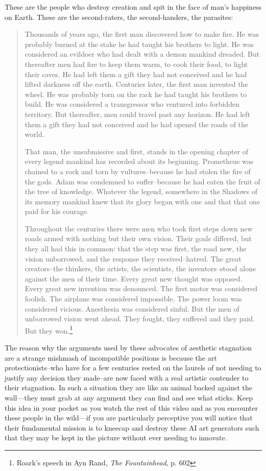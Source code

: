 \documentclass[11pt]{article}
\begin{document}
These are the people who destroy creation and spit in the face of man's happiness on Earth. These are the second-raters, the second-handers, the parasites:
\begin{quote}
Thousands of years ago, the first man discovered how to make fire. He was probably burned at the stake he had taught his brothers to light. He was considered an evildoer who had dealt with a demon mankind dreaded. But thereafter men had fire to keep them warm, to cook their food, to light their caves. He had left them a gift they had not conceived and he had lifted darkness off the earth. Centuries later, the first man invented the wheel. He was probably torn on the rack he had taught his brothers to build. He was considered a transgressor who ventured into forbidden territory. But thereafter, men could travel past any horizon. He had left them a gift they had not conceived and he had opened the roads of the world.

That man, the unsubmissive and first, stands in the opening chapter of every legend mankind has recorded about its beginning. Prometheus was chained to a rock and torn by vultures--because he had stolen the fire of the gods. Adam was condemned to suffer--because he had eaten the fruit of the tree of knowledge. Whatever the legend, somewhere in the Shadows of its memory mankind knew that its glory began with one and that that one paid for his courage.

Throughout the centuries there were men who took first steps down new roads armed with nothing but their own vision. Their goals differed, but they all had this in common: that the step was first, the road new, the vision unborrowed, and the response they received--hatred. The great creators--the thinkers, the artists, the scientists, the inventors--stood alone against the men of their time. Every great new thought was opposed. Every great new invention was denounced. The first motor was considered foolish. The airplane was considered impossible. The power loom was considered vicious. Anesthesia was considered sinful. But the men of unborrowed vision went ahead. They fought, they suffered and they paid. But they won.\footnote{Roark's speech in Ayn Rand, \emph{The Fountainhead}, p. 602}
\end{quote}

The reason why the arguments used by these advocates of aesthetic stagnation are a strange mishmash of incompatible positions is because the art protectionists--who have for a few centuries rested on the laurels of not needing to justify any decision they made--are now faced with a real artistic contender to their stagnation. In such a situation they are like an animal backed against the wall---they must grab at any argument they can find and see what sticks. Keep this idea in your pocket as you watch the rest of this video and as you encounter these people in the wild---if you are particularly perceptive you will notice that their fundamental mission is to kneecap and destroy these AI art generators such that they may be kept in the picture without ever needing to innovate.
\end{document}
